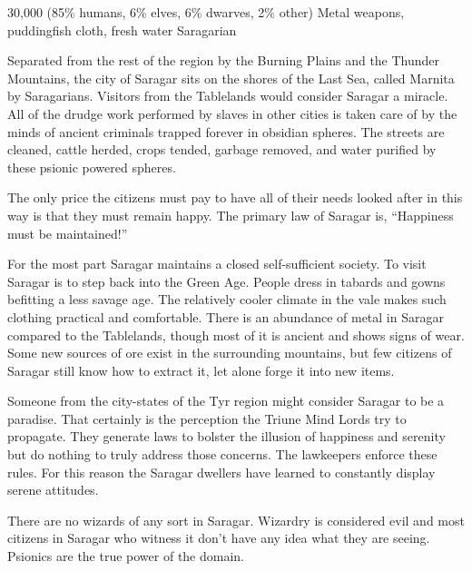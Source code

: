{30,000 (85\% humans, 6\% elves, 6\% dwarves, 2\% other)}
{Metal weapons, puddingfish cloth, fresh water}
{Saragarian}
{

	Separated from the rest of the region by the Burning Plains and the Thunder Mountains, the city of Saragar sits on the shores of the Last Sea, called Marnita by Saragarians. Visitors from the Tablelands would consider Saragar a miracle. All of the drudge work performed by slaves in other cities is taken care of by the minds of ancient criminals trapped forever in obsidian spheres. The streets are cleaned, cattle herded, crops tended, garbage removed, and water purified by these psionic powered spheres.

	The only price the citizens must pay to have all of their needs looked after in this way is that they must remain happy. The primary law of Saragar is, ``Happiness must be maintained!''
}
{
	For the most part Saragar maintains a closed self-sufficient society. To visit Saragar is to step back into the Green Age. People dress in tabards and gowns befitting a less savage age. The relatively cooler climate in the vale makes such clothing practical and comfortable. There is an abundance of metal in Saragar compared to the Tablelands, though most of it is ancient and shows signs of wear. Some new sources of ore exist in the surrounding mountains, but few citizens of Saragar still know how to extract it, let alone forge it into new items.

	Someone from the city-states of the Tyr region might consider Saragar to be a paradise. That certainly is the perception the Triune Mind Lords try to propagate. They generate laws to bolster the illusion of happiness and serenity but do nothing to truly address those concerns. The lawkeepers enforce these rules. For this reason the Saragar dwellers have learned to constantly display serene attitudes.

	There are no wizards of any sort in Saragar. Wizardry is considered evil and most citizens in Saragar who witness it don't have any idea what they are seeing. Psionics are the true power of the domain.
}
